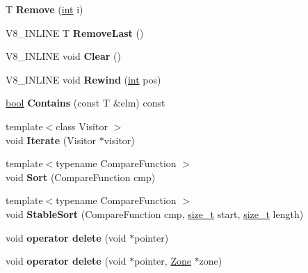 \begin{DoxyCompactItemize}
\item 
\mbox{\label{classv8_1_1internal_1_1ZoneList_a5b6d289d5c66b02d682dd4b0f3b079aa}} 
T {\bfseries Remove} (\mbox{\hyperlink{classint}{int}} i)
\item 
\mbox{\label{classv8_1_1internal_1_1ZoneList_a96ed79442bd782e28e5e8de08beb0bd9}} 
V8\+\_\+\+I\+N\+L\+I\+NE T {\bfseries Remove\+Last} ()
\item 
\mbox{\label{classv8_1_1internal_1_1ZoneList_a67ed2b88e41d86f603ab82ad1032aa48}} 
V8\+\_\+\+I\+N\+L\+I\+NE void {\bfseries Clear} ()
\item 
\mbox{\label{classv8_1_1internal_1_1ZoneList_ab5326f399c34623de703eba5318d6663}} 
V8\+\_\+\+I\+N\+L\+I\+NE void {\bfseries Rewind} (\mbox{\hyperlink{classint}{int}} pos)
\item 
\mbox{\label{classv8_1_1internal_1_1ZoneList_ad6f42c20cb61527977ca9f8409486402}} 
\mbox{\hyperlink{classbool}{bool}} {\bfseries Contains} (const T \&elm) const
\item 
\mbox{\label{classv8_1_1internal_1_1ZoneList_a91df1e6f75d954dffb7063fdf990b654}} 
{\footnotesize template$<$class Visitor $>$ }\\void {\bfseries Iterate} (Visitor $\ast$visitor)
\item 
\mbox{\label{classv8_1_1internal_1_1ZoneList_a6ed0d7aa417a231cc2523936c4c5504c}} 
{\footnotesize template$<$typename Compare\+Function $>$ }\\void {\bfseries Sort} (Compare\+Function cmp)
\item 
\mbox{\label{classv8_1_1internal_1_1ZoneList_a454295d8e1b85d0fb3a5f28664d5753d}} 
{\footnotesize template$<$typename Compare\+Function $>$ }\\void {\bfseries Stable\+Sort} (Compare\+Function cmp, \mbox{\hyperlink{classsize__t}{size\+\_\+t}} start, \mbox{\hyperlink{classsize__t}{size\+\_\+t}} length)
\item 
\mbox{\label{classv8_1_1internal_1_1ZoneList_ad34e89232a7e498218bab40cb231798d}} 
void {\bfseries operator delete} (void $\ast$pointer)
\item 
\mbox{\label{classv8_1_1internal_1_1ZoneList_a92bd2e802a848cf5986f45a740c740c3}} 
void {\bfseries operator delete} (void $\ast$pointer, \mbox{\hyperlink{classv8_1_1internal_1_1Zone}{Zone}} $\ast$zone)
\end{DoxyCompactItemize}


